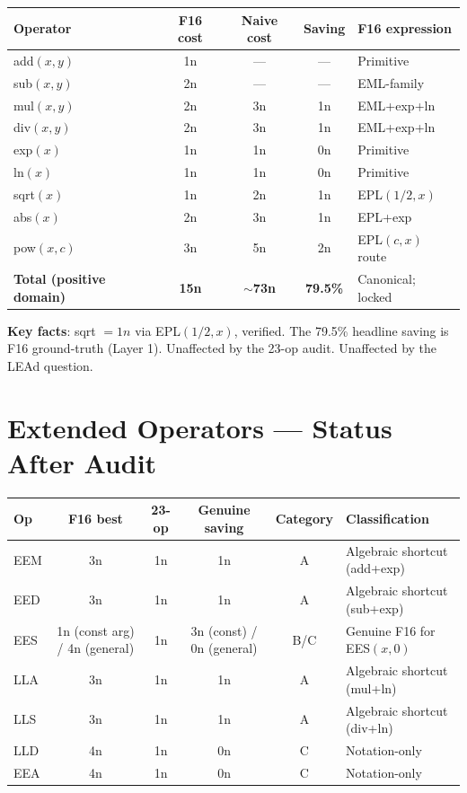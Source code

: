 \documentclass[11pt]{article}
\begin{document}
\begin{center}
\renewcommand{\arraystretch}{1.2}
\begin{tabular}{lcccl}
\toprule
Operator & F16 cost & Naive cost & Saving & F16 expression \\
\midrule
add$(x,y)$ & 1n & --- & --- & Primitive \\
sub$(x,y)$ & 2n & --- & --- & EML-family \\
mul$(x,y)$ & 2n & 3n & 1n & EML+exp+ln \\
div$(x,y)$ & 2n & 3n & 1n & EML+exp+ln \\
exp$(x)$   & 1n & 1n & 0n & Primitive \\
ln$(x)$    & 1n & 1n & 0n & Primitive \\
sqrt$(x)$  & 1n & 2n & 1n & EPL$(1/2, x)$ \\
abs$(x)$   & 2n & 3n & 1n & EPL+exp \\
pow$(x,c)$ & 3n & 5n & 2n & EPL$(c,x)$ route \\
\midrule
\textbf{Total (positive domain)} & \textbf{15n} & \textbf{$\sim$73n} & \textbf{79.5\%} & Canonical; locked \\
\bottomrule
\end{tabular}
\end{center}

\textbf{Key facts}: sqrt $= 1n$ via EPL$(1/2,x)$, verified.
The 79.5\% headline saving is F16 ground-truth (Layer 1). Unaffected by the
23-op audit. Unaffected by the LEAd question.

\section{Extended Operators — Status After Audit}

\begin{center}
\renewcommand{\arraystretch}{1.2}
\begin{tabular}{lccccl}
\toprule
Op & F16 best & 23-op & Genuine saving & Category & Classification \\
\midrule
EEM & 3n & 1n & 1n & A & Algebraic shortcut (add+exp) \\
EED & 3n & 1n & 1n & A & Algebraic shortcut (sub+exp) \\
EES & 1n (const arg) / 4n (general) & 1n & 3n (const) / 0n (general) & B/C & Genuine F16 for EES$(x,0)$ \\
LLA & 3n & 1n & 1n & A & Algebraic shortcut (mul+ln) \\
LLS & 3n & 1n & 1n & A & Algebraic shortcut (div+ln) \\
LLD & 4n & 1n & 0n & C & Notation-only \\
EEA & 4n & 1n & 0n & C & Notation-only \\
\bottomrule
\end{tabular}
\end{center}
\end{document}
